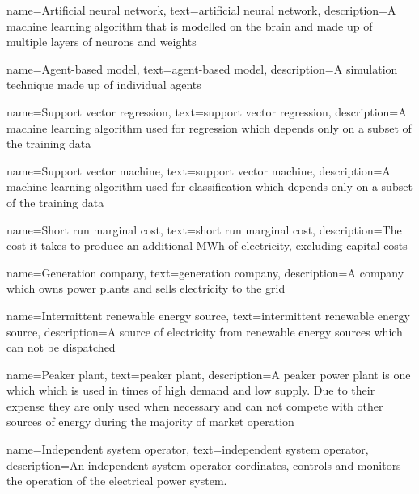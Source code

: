 {
        name=Artificial neural network,
        text=artificial neural network,
        description={A machine learning algorithm that is modelled on the brain and made up of multiple layers of neurons and weights}
}



{
        name=Agent-based model,
        text=agent-based model,
        description={A simulation technique made up of individual agents}
}




{
        name=Support vector regression,
        text=support vector regression,
        description={A machine learning algorithm used for regression which depends only on a subset of the training data}
}




{
	name=Support vector machine,
	text=support vector machine,
	description={A machine learning algorithm used for classification which depends only on a subset of the training data}
}






{
	name=Short run marginal cost,
	text=short run marginal cost,
	description={The cost it takes to produce an additional MWh of electricity, excluding capital costs}
}



{
	name=Generation company,
	text=generation company,
	description={A company which owns power plants and sells electricity to the grid}
}




{
	name=Intermittent renewable energy source,
	text=intermittent renewable energy source,
	description={A source of electricity from renewable energy sources which can not be dispatched}
}


{
	name=Peaker plant,
	text=peaker plant,
	description={A peaker power plant is one which which is used in times of high demand and low supply. Due to their expense they are only used when necessary and can not compete with other sources of energy during the majority of market operation}
}


{
	name=Independent system operator,
	text=independent system operator,
	description={An independent system operator cordinates, controls and monitors the operation of the electrical power system.}
}


